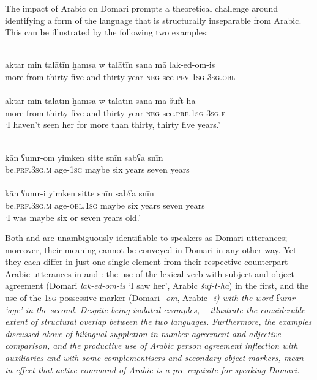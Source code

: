 \documentclass[output=paper]{langsci/langscibook}
\begin{document}
The impact of Arabic on Domari prompts a theoretical challenge around identifying a form of the language that is structurally inseparable from Arabic. This can be illustrated by the following two examples:

\ea \label{aktar1}
\ea
{}\\
\gll aktar min talātīn ḫamsa w talātīn sana mā lak-ed-om-is\\
     more from thirty five and thirty year \textsc{neg} see-\textsc{pfv-1sg-3sg.obl}\\ \label{aktar}
\ex
{}\\
\gll aktar min talātīn ḫamsa w talatīn sana mā šuft-ha\\
     more from thirty five and thirty year \textsc{neg} see.\textsc{prf.1sg-3sg.f}\\ \label{aktar2}
\glt ‘I haven’t seen her for more than thirty, thirty five years.’
\z
\z

\ea \label{umr1}
\ea
{}\\
\gll kān ʕumr-om yimken sitte snīn sabʕa snīn\\
     be\textsc{.prf.3sg.m} age-\textsc{1sg} maybe six years seven years\\ \label{umr}
\ex
{}\\
\gll kān ʕumr-i yimken sitte snīn sabʕa snīn\\
     be\textsc{.prf.3sg.m} age-\textsc{obl.1sg} maybe six years seven years\\ \label{umr2}
\glt ‘I was maybe six or seven years old.’
\z
\z

Both  and  are unambiguously identifiable to speakers as Domari utterances; moreover, their meaning cannot be conveyed in Domari in any other way. Yet they each differ in just one single element from their respective counterpart Arabic utterances in  and : the use of the lexical verb with subject and object agreement (Domari \textit{lak-ed-om-is} ‘I saw her’, Arabic \textit{šuf-t-ha}) in the first, and the use of the \textsc{1sg} possessive marker (Domari \-\textit{{}-om}, Arabic \textit{-i\textup{) with the word} ʕumr \textup{‘age’ in the second. Despite being isolated examples, – illustrate the considerable extent of structural overlap between the two languages. Furthermore, the examples discussed above of bilingual suppletion in number agreement and adjective comparison, and the productive use of Arabic person agreement inflection with auxiliaries and with some complementisers and secondary object markers, mean in effect that active command of Arabic is a pre-requisite for speaking Domari.}}
\end{document}
